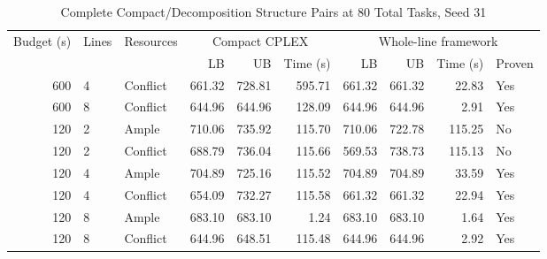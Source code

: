 \begin{table}[!t]
\caption{Complete Compact/Decomposition Structure Pairs at 80 Total Tasks, Seed 31}\label{tab:structure}\centering\small
\begin{tabular}{rllrrrrrrl}\toprule
Budget (s)&Lines&Resources&\multicolumn{3}{c}{Compact CPLEX}&\multicolumn{4}{c}{Whole-line framework}\\\cmidrule(lr){4-6}\cmidrule(lr){7-10}
&&&LB&UB&Time (s)&LB&UB&Time (s)&Proven\\\midrule
600 & 4 & Conflict & 661.32 & 728.81 & 595.71 & 661.32 & 661.32 & 22.83 & Yes\\
600 & 8 & Conflict & 644.96 & 644.96 & 128.09 & 644.96 & 644.96 & 2.91 & Yes\\
120 & 2 & Ample & 710.06 & 735.92 & 115.70 & 710.06 & 722.78 & 115.25 & No\\
120 & 2 & Conflict & 688.79 & 736.04 & 115.66 & 569.53 & 738.73 & 115.13 & No\\
120 & 4 & Ample & 704.89 & 725.16 & 115.52 & 704.89 & 704.89 & 33.59 & Yes\\
120 & 4 & Conflict & 654.09 & 732.27 & 115.58 & 661.32 & 661.32 & 22.94 & Yes\\
120 & 8 & Ample & 683.10 & 683.10 & 1.24 & 683.10 & 683.10 & 1.64 & Yes\\
120 & 8 & Conflict & 644.96 & 648.51 & 115.48 & 644.96 & 644.96 & 2.92 & Yes\\
\bottomrule\end{tabular}
\end{table}
